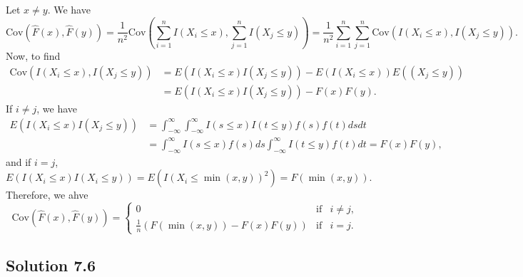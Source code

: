 Let $x \neq y$.
We have
\begin{equation*}
    \mathrm{Cov}(\hat{F}(x), \hat{F}(y))
        = \frac{1}{n^2} \mathrm{Cov}(\sum_{i = 1}^n I(X_i \leq x), \sum_{j = 1}^n I(X_j \leq y))
        = \frac{1}{n^2} \sum_{i = 1}^n \sum_{j = 1}^n \mathrm{Cov}(I(X_i \leq x), I(X_j \leq y)).
\end{equation*}
Now, to find
\begin{equation*}
    \begin{split}
        \mathrm{Cov}(I(X_i \leq x), I(X_j \leq y))
            &= E(I(X_i \leq x) I(X_j \leq y)) - E(I(X_i \leq x)) E((X_j \leq y)) \\
            &= E(I(X_i \leq x) I(X_j \leq y)) - F(x) F(y).
    \end{split}
\end{equation*}
If $i \neq j$, we have
\begin{equation*}
    \begin{split}
        E(I(X_i \leq x) I(X_j \leq y))
            &= \int_{-\infty}^{\infty} \int_{-\infty}^{\infty} I(s \leq x) I(t \leq y) f(s) f(t) ds dt \\
            &= \int_{-\infty}^{\infty} I(s \leq x) f(s) ds \int_{-\infty}^{\infty} I(t \leq y) f(t) dt
            = F(x) F(y),
    \end{split}
\end{equation*}
and if $i = j$,
\begin{equation*}
    E(I(X_i \leq x) I(X_i \leq y))
        = E(I(X_i \leq \min(x, y))^2)
        = F(\min(x, y)).
\end{equation*}
Therefore, we ahve
\begin{equation*}
    \mathrm{Cov}(\hat{F}(x), \hat{F}(y))
        = \left\{
            \begin{array}{lll}
                0 & \text{if} & i \neq j, \\
                \frac{1}{n}(F(\min(x, y)) - F(x)F(y)) & \text{if} & i = j.
            \end{array}
        \right.
\end{equation*}


\subsection*{Solution 7.6}

